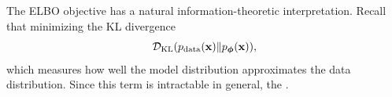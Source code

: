 






The ELBO objective has a natural information-theoretic interpretation. 
Recall that  minimizing the KL divergence
\[
\mathcal{D}_{\mathrm{KL}}(p_{\text{data}}({\mathbf{x}}) \| p_{\bm{\phi}}({\mathbf{x}})),
\]
which measures how well the model distribution approximates the data distribution. 
Since this term is intractable in general, the .

